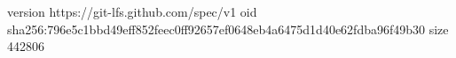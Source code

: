 version https://git-lfs.github.com/spec/v1
oid sha256:796e5c1bbd49eff852feec0ff92657ef0648eb4a6475d1d40e62fdba96f49b30
size 442806
